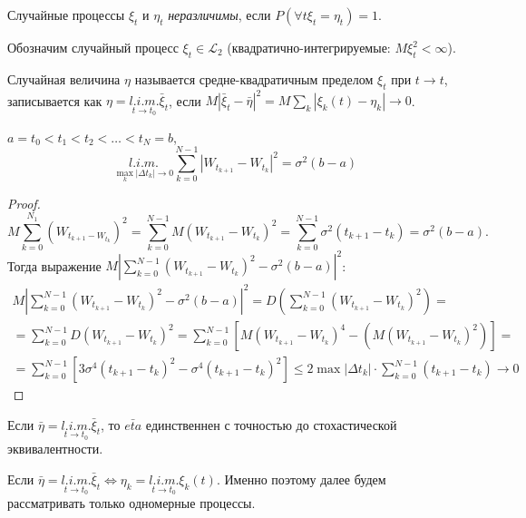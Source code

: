\begin{definition}
  Случайные процессы $\xi_t$ и $\eta_t$ \emph{неразличимы}, если 
  $P(\forall t \xi_t = \eta_t) = 1$.
\end{definition}

Обозначим случайный процесс 
$\xi_t \in \mathcal{L}_2$ (квадратично-интегрируемые: $M\xi_t^2 < \infty$).


\begin{definition}
  Случайная величина $\eta$ называется средне-квадратичным пределом $\xi_t$ при $t\to t$,
  записывается как $\eta = \underset{t\to t_0}{l.i.m.} \bar{\xi}_t$,
  если $M|\bar{\xi}_t -\bar{\eta}|^2 = M \sum_k |\xi_k(t) - \eta_k| \to 0$.
\end{definition}

\begin{ex}
  $a = t_0 < t_1 < t_2 < \dots < t_N = b$,
  \[
    \underset{\max_k |\Delta t_k| \to 0}{l.i.m.} \sum_{k=0}^{N-1} |W_{t_{k+1}} - W_{t_k}|^2
    = \sigma^2 (b-a)
  \]
  \begin{proof}
    \[
      M \sum_{k=0}^{N_1} (W_{t_{k+1} - W_{t_k}})^2 = \sum_{k=0}^{N-1} M(W_{t_{k+1}} - W_{t_k})^2
      = \sum_{k=0}^{N-1} \sigma^2 (t_{k+1} - t_{k}) = \sigma^2 (b-a).
    \]
    Тогда выражение $M \left|\sum_{k=0}^{N-1} (W_{t_{k+1}} - W_{t_k})^2 - \sigma^2 (b-a)\right|^2$:
    \begin{multline*}
      M \left|\sum_{k=0}^{N-1} (W_{t_{k+1}} - W_{t_k})^2 - \sigma^2 (b-a)\right|^2 
      = D \left( \sum_{k=0}^{N-1} (W_{t_{k+1}} - W_{t_k})^2 \right) = \\
      = \sum_{k=0}^{N-1} D \left( W_{t_{k+1}} - W_{t_k} \right)^2
      = \sum_{k=0}^{N-1} \left[
        M(W_{t_{k+1}} - W_{t_k})^4 - \left( M(W_{t_{k+1}} - W_{t_k})^2 \right) \right] = \\
      = \sum_{k=0}^{N-1} \left[ 3\sigma^4 (t_{k+1} - t_k)^2 - \sigma^4 (t_{k+1} - t_k)^2 \right]
      \leqslant 2 \max |\Delta t_k| \cdot \sum_{k=0}^{N-1} (t_{k+1} - t_k) \to 0
    \end{multline*}
  \end{proof}
\end{ex}

\begin{remark}
  Если $\bar{\eta} = \underset{t \to t_0}{l.i.m.} \bar{\xi}_t$, то $\bar{eta}$
  единственнен с точностью до стохастической эквивалентности.
\end{remark}

\begin{remark}
  Если $\bar{\eta} = \underset{t \to t_0}{l.i.m.} \bar{\xi}_t \Leftrightarrow \eta_k = \underset{t \to t_0}{l.i.m.} \xi_k(t)$. Именно поэтому далее будем рассматривать только одномерные процессы.
\end{remark}

